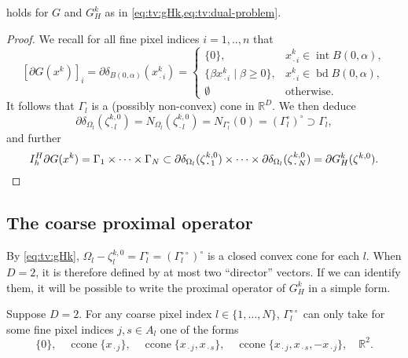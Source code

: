 \documentclass[a4paper,english]{jnsao}
\theoremstyle{definition}
\numberwithin{algorithm}{section}
\newcommand{\cj}[1]{\{ #1\}}
\newcommand{\df}[2]{#1 ( #2 )}
\def\R{\mathbb{R}}
\DeclareMathOperator{\interior}{int}
\DeclareMathOperator{\boundary}{bd}
\DeclareMathOperator{\ccone}{ccone}
\newcommand{\freevar}{\,\boldsymbol\cdot\,}
\def\polar#1{#1^\circ}
\def\bipolar#1{#1^{\circ\circ}}
\begin{document}
\begin{lemma}
     holds for $G$ and $G_H^k$ as in \cref{eq:tv:gHk,eq:tv:dual-problem}.
\end{lemma}

\begin{proof}
    We recall for all fine pixel indices $i=1,..,n$ that
    \begin{equation}
        \label{eq:cap4:subdGpsr}
        \left[\partial \df{G}{x^k}\right]_i
        =\df{\partial \delta _{\df{B}{0,\alpha}}}{x^k_{\freevar i}}=\left\{\begin{array}{ll}
        \cj{0}, & x^k_{\freevar i} \in \interior B(0, \alpha),  \\
        \cj{\beta x^k_{\freevar i} \mid \beta\geq 0}, & x^k_{\freevar i} \in \boundary B(0, \alpha), \\
        \emptyset & \text{otherwise}.
        \end{array}\right.
    \end{equation}
    It follows that $\Gamma_l$ is a (possibly non-convex) cone in $\R^D$.
    We then deduce
    \[
        \partial \delta_{\Omega_l}(\zeta_{\freevar l}^{k,0})
        =
        N_{\Omega_l}(\zeta_{\freevar l}^{k,0})
        =
        N_{\Gamma_l^\circ}(0)
        = (\Gamma_l^\circ)^\circ \supset \Gamma_l,
    \]
    and further
    \[
        I_h^H \partial G(x^k)
        = \Gamma_1 \times \cdots \times \Gamma_N
        \subset
        \partial \delta _{\Omega _l}(\zeta _{\freevar 1}^{k,0})
        \times \cdots \times
        \partial \delta _{\Omega _l}(\zeta _{\freevar N}^{k,0})
        = \partial G_H^k(\zeta ^{k,0}).
        \qedhere
    \]
\end{proof}

\subsection{The coarse proximal operator}
\label{sec:tv:coarse-prox}

By \eqref{eq:tv:gHk}, $\Omega_l - \zeta_l^{k,0} = \polar\Gamma_l = \polar{(\bipolar\Gamma_l)}$ is a closed convex cone for each $l$.
When $D=2$, it is therefore defined by at most two “director” vectors.
If we can identify them, it will be possible to write the proximal operator of $G_H^k$ in a simple form.

\begin{lemma}
    \label{lemma:tv:gamma}
    Suppose $D=2$.
    For any coarse pixel index $l \in \{1,\ldots,N\}$, $\bipolar \Gamma_l$ can only take for some fine pixel indices $j,s \in A_l$ one of the forms
    \[
        \cj{0},\quad \ccone\cj{x_{\freevar j}},\quad \ccone\cj{x_{\freevar j},x_{\freevar s}},\quad \ccone\cj{x_{\freevar j},x_{\freevar s},-x_{\freevar j}},\quad \R^2.
    \]
\end{lemma}
\end{document}
